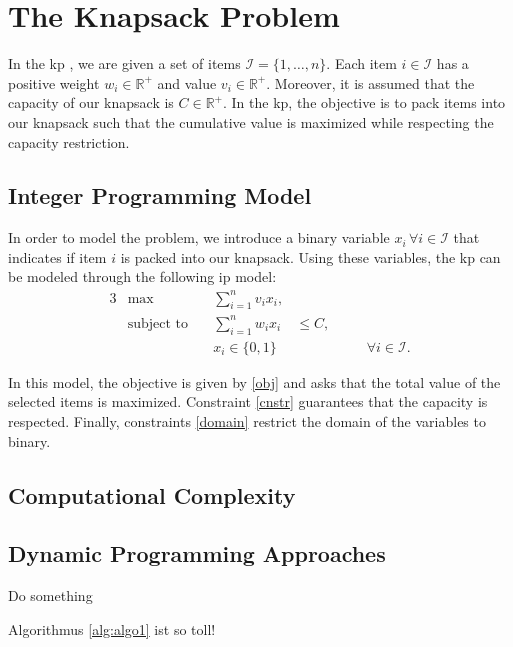 \section{The Knapsack Problem}
\label{section:kp}
In the \ac{kp} \parencite[refer to][]{martello_knapsack_1990}, we are given a set of items $\mathcal{I}=\{1, \dots, n\}$.
Each item $i \in \mathcal{I}$ has a positive weight $w_i \in \mathbb{R^+}$ and value $v_i \in \mathbb{R^+}$.
Moreover, it is assumed that the capacity of our knapsack is $C \in \mathbb{R^+}$.
In the \ac{kp}, the objective is to pack items into our knapsack such that the cumulative value is maximized while respecting the capacity restriction.

\subsection{Integer Programming Model}
In order to model the problem, we introduce a binary variable $x_i \, \forall i \in \mathcal{I}$ that indicates if item $i$ is packed into our knapsack. 
Using these variables, the \ac{kp} can be modeled through the following \ac{ip} model:
\begin{alignat}{3}
   & \max              & \quad \sum_{i=1}^n v_i x_i,  &         && \quad \label{obj}                               \\
   & \text{subject to} & \quad \sum_{i = 1}^n w_i x_i & \leq C, && \quad \label{cnstr}                             \\
   &                   & \quad x_i \in \{0,1\}        &         && \quad \forall i \in \mathcal{I}. \label{domain}
\end{alignat}

In this model, the objective is given by \eqref{obj} and asks that the total value of the selected items is maximized.
Constraint \eqref{cnstr} guarantees that the capacity is respected.
Finally, constraints \eqref{domain} restrict the domain of the variables to binary.

\subsection{Computational Complexity}
\blindtext
\subsection{Dynamic Programming Approaches}
\blindtext

\begin{algorithm}[H]
    \label{alg:algo1}
  \DontPrintSemicolon
  {
    Do something 
  }
  \caption{Example code}
\end{algorithm}

Algorithmus \ref{alg:algo1} ist so toll!

